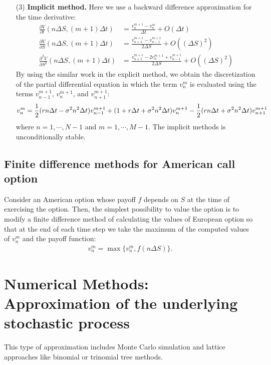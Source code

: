 \documentclass[11pt,letter]{article}
\def\D{\Delta} \def\G{\Gamma} \def\W{\Omega} \def\P{\Phi} \def\L{\Lambda} \def\Th{\Theta} \def\z{\zeta}
\theoremstyle{definition}
\theoremstyle{remark}
\numberwithin{equation}{section}
\begin{document}
\begin{itemize}
        \item[(3)] \textbf{Implicit method.} Here we use a backward difference approximation for the time derivative:
        \begin{align}
            \frac{\partial V}{\partial t}(n\D S,(m+1)\D t)&=\frac{v_n^{m+1}-v_n^m}{\D t}+O(\D t)\\
            \frac{\partial V}{\partial S}(n\D S,(m+1)\D t)&=\frac{v_{n+1}^{m+1}-v_{n-1}^{m+1}}{2\D S}+O((\D S)^2)\\
            \frac{\partial^2 V}{\partial S^2}(n\D S,(m+1)\D t)&=\frac{v_{n+1}^{m+1}-2v_n^{m+1}+v_{n-1}^{m+1}}{2\D S}+O((\D S)^2)
        \end{align}
        By using the similar work in the explicit method, we obtain the discretization of the partial differential equation in which the term $v_n^m$ is evaluated using the terms $v_{n-1}^{m+1}$, $v_n^{m+1}$, and $v_{n+1}^{m+1}$: 
        \begin{align*}
            v_n^m=\frac{1}{2}(rn\D t-\s^2n^2\D t)v_{n-1}^{m+1}+(1+r\D t+\s^2n^2\D t)v_n^{m+1}-\frac{1}{2}(rn\D t+\s^2n^2\D t)v_{n+1}^{m+1}
        \end{align*}
        where $n=1,\cdots,N-1$ and $m=1,\cdots,M-1$.
        The implicit methods is unconditionally stable.
    \end{itemize}
    
\subsection{Finite difference methods for American call option}
Consider an American option whose payoff $f$ depends on $S$ at the time of exercising the option. Then, the simplest possibility to value the option is to modify a finite difference method of calculating the values of European option so that at the end of each time step we take the maximum of the computed values of $v_n^m$ and the payoff function:
    \begin{align}
        v_n^m=\max\Big\{v_n^m,f(n\D S)\Big\}.
    \end{align}


\section{Numerical Methods: Approximation of the underlying stochastic process}
This type of approximation includes Monte Carlo simulation and lattice approaches like binomial or trinomial tree methods.
\end{document}
